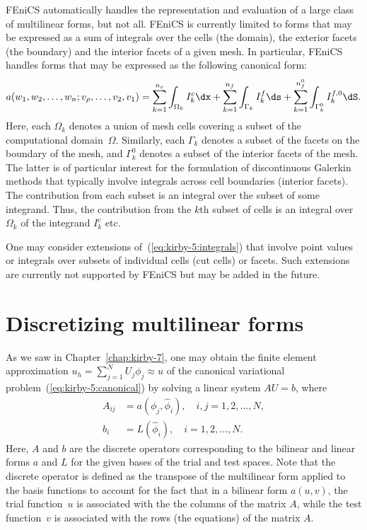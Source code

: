 FEniCS automatically handles the representation and evaluation of a
large class of multilinear forms, but not all. FEniCS is currently
limited to forms that may be expressed as a sum of integrals over the
cells (the domain), the exterior facets (the boundary) and the
interior facets of a given mesh. In particular, FEniCS handles forms
that may be expressed as the following canonical form:
\begin{equation} \label{eq:kirby-5:integrals}
  a(w_1, w_2, \ldots, w_n; v_{\rho}, \ldots, v_2, v_1)
  =
  \sum_{k=1}^{n_c}   \int_{\Omega_k} I^c_k \dx +
  \sum_{k=1}^{n_f}   \int_{\Gamma_k} I^f_k \ds +
  \sum_{k=1}^{n_f^0} \int_{\Gamma_k^0} I^{f,0}_k \dS.
\end{equation}
Here, each $\Omega_k$ denotes a union of mesh cells covering a subset
of the computational domain~$\Omega$. Similarly, each $\Gamma_k$
denotes a subset of the facets on the boundary of the mesh, and
$\Gamma_k^0$ denotes a subset of the interior facets of the
mesh. The latter is of particular interest for the formulation of
discontinuous Galerkin methods that typically involve integrals across
cell boundaries (interior facets). The contribution from each subset
is an integral over the subset of some integrand. Thus, the
contribution from the $k$th subset of cells is an integral over
$\Omega_k$ of the integrand $I^c_k$ etc.

One may consider extensions of~(\ref{eq:kirby-5:integrals}) that
involve point values or integrals over subsets of individual cells
(cut cells) or facets. Such extensions are currently not supported by
FEniCS but may be added in the future.

\section{Discretizing multilinear forms}
\label{sec:kirby-5:discretizing}

As we saw in Chapter~\ref{chap:kirby-7}, one may obtain the finite
element approximation $u_h = \sum_{j=1}^N U_j \phi_j \approx u$ of the
canonical variational problem~(\ref{eq:kirby-5:canonical}) by solving a
linear system $AU=b$, where
\begin{equation}
  \begin{split}
    A_{ij} &= a(\phi_j, \hat{\phi}_i), \quad i,j = 1,2,\ldots,N, \\
    b_i &= L(\hat{\phi}_i), \quad i = 1,2,\ldots,N.
  \end{split}
\end{equation}
Here, $A$ and $b$ are the discrete operators corresponding to the
bilinear and linear forms $a$ and $L$ for the given bases of the trial
and test spaces. Note that the discrete operator is defined as the
transpose of the multilinear form applied to the basis functions to
account for the fact that in a bilinear form $a(u, v)$, the trial
function~$u$ is associated with the the columns of the matrix $A$,
while the test function~$v$ is associated with the rows (the
equations) of the matrix $A$.

